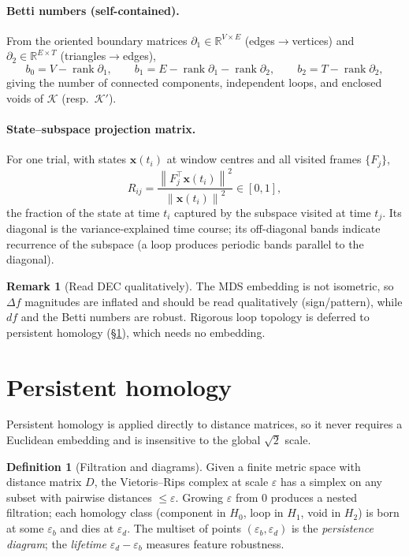 \documentclass[11pt]{article}
\newcommand{\R}{\mathbb{R}}
\newcommand{\rank}{\operatorname{rank}}
\newcommand{\norm}[1]{\left\lVert #1 \right\rVert}
\theoremstyle{definition}
\newtheorem{definition}{Definition}
\newtheorem{remark}{Remark}
\begin{document}
\paragraph{Betti numbers (self-contained).} From the oriented boundary matrices
$\partial_1\in\R^{V\times E}$ (edges$\to$vertices) and
$\partial_2\in\R^{E\times T}$ (triangles$\to$edges),
\begin{equation}
b_0 = V - \rank\partial_1,\qquad
b_1 = E - \rank\partial_1 - \rank\partial_2,\qquad
b_2 = T - \rank\partial_2,
\end{equation}
giving the number of connected components, independent loops, and enclosed voids of
$\mathcal{K}$ (resp.\ $\mathcal{K}'$).

\paragraph{State--subspace projection matrix.} For one trial, with states $\bm{x}(t_i)$ at
window centres and all visited frames $\{F_j\}$,
\begin{equation}
R_{ij} = \frac{\norm{F_j^\top \bm{x}(t_i)}^2}{\norm{\bm{x}(t_i)}^2} \in [0,1],
\end{equation}
the fraction of the state at time $t_i$ captured by the subspace visited at time
$t_j$. Its diagonal is the variance-explained time course; its off-diagonal bands
indicate recurrence of the subspace (a loop produces periodic bands parallel to the diagonal).

\begin{remark}[Read DEC qualitatively]
The MDS embedding is not isometric, so $\Delta f$ magnitudes are inflated and
should be read qualitatively (sign/pattern), while $df$ and the Betti numbers are
robust. Rigorous loop topology is deferred to persistent homology
(\S\ref{sec:tda}), which needs no embedding.
\end{remark}

\section{Persistent homology}
\label{sec:tda}

Persistent homology is applied directly to distance matrices, so it never requires a
Euclidean embedding and is insensitive to the global $\sqrt2$ scale.

\begin{definition}[Filtration and diagrams]
Given a finite metric space with distance matrix $D$, the Vietoris--Rips complex at
scale $\varepsilon$ has a simplex on any subset with pairwise distances
$\le\varepsilon$. Growing $\varepsilon$ from $0$ produces a nested filtration; each
homology class (component in $H_0$, loop in $H_1$, void in $H_2$) is born at some
$\varepsilon_b$ and dies at $\varepsilon_d$. The multiset of points
$(\varepsilon_b,\varepsilon_d)$ is the \emph{persistence diagram}; the
\emph{lifetime} $\varepsilon_d-\varepsilon_b$ measures feature robustness.
\end{definition}
\end{document}
